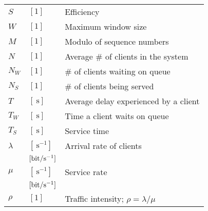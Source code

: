 \documentclass{form}
\begin{document}
\begin{center}
\begin{minipage}{0.49\textwidth}
\begin{tabular}{l l | p{59mm}}
            $S$           & $[1                       ]$ & Efficiency                                                  \\
            $W$           & $[1                       ]$ & Maximum window size                                         \\
            $M$           & $[1                       ]$ & Modulo of sequence numbers                                  \\
            $N$           & $[1                       ]$ & Average \# of clients in the system                         \\
            $N_W$         & $[1                       ]$ & \# of clients waiting on queue                              \\
            $N_S$         & $[1                       ]$ & \# of clients being served                                  \\
            $T$           & $[\SI{}{\second}          ]$ & Average delay experienced by a client                       \\
            $T_W$         & $[\SI{}{\second}          ]$ & Time a client waits on queue                                \\
            $T_S$         & $[\SI{}{\second}          ]$ & Service time                                                \\
            $\lambda$     & $[\SI{}{     \second^{-1}}]$ & Arrival rate of clients                                     \\
                          & $[\SI{}{\bit/\second^{-1}}]$ &                                                             \\
            $\mu$         & $[\SI{}{     \second^{-1}}]$ & Service rate                                                \\
                          & $[\SI{}{\bit/\second^{-1}}]$ &                                                             \\
            $\rho$        & $[1                       ]$ & Traffic intensity; $\rho = \lambda/\mu$                     \\
        \end{tabular}
    \end{minipage}
\end{center}
\end{document}
